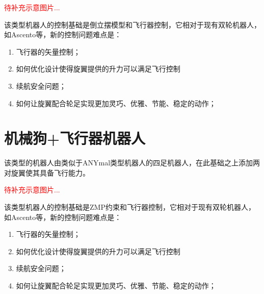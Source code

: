 \textcolor{red}{\small
待补充示意图片...
}

该类型机器人的控制基础是倒立摆模型和飞行器控制，它相对于现有双轮机器人，如Ascento\cite[p1]{Klemm_Morra_Salzmann_Tschopp_Bodie_Gulich_Kung_Mannhart_Pfister_Vierneisel_et_al_2019}等，新的控制问题难点是：
\begin{enumerate}
  \item 飞行器的矢量控制；
  \item 如何优化设计使得旋翼提供的升力可以满足飞行控制
  \item 续航安全问题；
  \item 如何让旋翼配合轮足实现更加灵巧、优雅、节能、稳定的动作；
\end{enumerate}

\section[机械狗+飞行器机器人]{机械狗+飞行器机器人}
该类型的机器人由类似于ANYmal\cite[p1]{Hwangbo_Lee_Dosovitskiy_Bellicoso_Tsounis_Koltun_Hutter_2019}类型机器人的四足机器人，在此基础之上添加两对旋翼使其具备飞行能力。

\textcolor{red}{\small
待补充示意图片...
}

该类型机器人的控制基础是ZMP约束和飞行器控制，它相对于现有双轮机器人，如Ascento\cite[p1]{Klemm_Morra_Salzmann_Tschopp_Bodie_Gulich_Kung_Mannhart_Pfister_Vierneisel_et_al_2019}等，新的控制问题难点是：
\begin{enumerate}
  \item 飞行器的矢量控制；
  \item 如何优化设计使得旋翼提供的升力可以满足飞行控制
  \item 续航安全问题；
  \item 如何让旋翼配合轮足实现更加灵巧、优雅、节能、稳定的动作；
\end{enumerate}